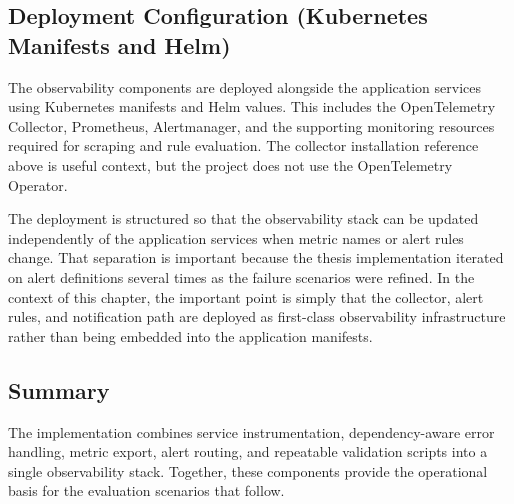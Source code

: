 \subsection{Deployment Configuration (Kubernetes Manifests and Helm)}

The observability components are deployed alongside the application services using Kubernetes manifests and Helm values. This includes the OpenTelemetry Collector, Prometheus, Alertmanager, and the supporting monitoring resources required for scraping and rule evaluation. The collector installation reference above is useful context, but the project does not use the OpenTelemetry Operator.

The deployment is structured so that the observability stack can be updated independently of the application services when metric names or alert rules change. That separation is important because the thesis implementation iterated on alert definitions several times as the failure scenarios were refined. In the context of this chapter, the important point is simply that the collector, alert rules, and notification path are deployed as first-class observability infrastructure rather than being embedded into the application manifests.

\subsection{Summary}

The implementation combines service instrumentation, dependency-aware error handling, metric export, alert routing, and repeatable validation scripts into a single observability stack. Together, these components provide the operational basis for the evaluation scenarios that follow.
